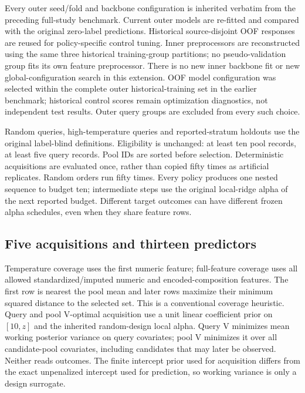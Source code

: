 \documentclass[11pt]{article}
\begin{document}
Every outer seed/fold and backbone configuration is inherited verbatim from the preceding full-study benchmark. Current outer models are re-fitted and compared with the original zero-label predictions. Historical source-disjoint OOF responses are reused for policy-specific control tuning. Inner preprocessors are reconstructed using the same three historical training-group partitions; no pseudo-validation group fits its own feature preprocessor. There is no new inner backbone fit or new global-configuration search in this extension. OOF model configuration was selected within the complete outer historical-training set in the earlier benchmark; historical control scores remain optimization diagnostics, not independent test results. Outer query groups are excluded from every such choice.

Random queries, high-temperature queries and reported-stratum holdouts use the original label-blind definitions. Eligibility is unchanged: at least ten pool records, at least five query records. Pool IDs are sorted before selection. Deterministic acquisitions are evaluated once, rather than copied fifty times as artificial replicates. Random orders run fifty times. Every policy produces one nested sequence to budget ten; intermediate steps use the original local-ridge alpha of the next reported budget. Different target outcomes can have different frozen alpha schedules, even when they share feature rows.

\subsection{Five acquisitions and thirteen predictors}
Temperature coverage uses the first numeric feature; full-feature coverage uses all allowed standardized/imputed numeric and encoded-composition features. The first row is nearest the pool mean and later rows maximize their minimum squared distance to the selected set. This is a conventional coverage heuristic. Query and pool V-optimal acquisition use a unit linear coefficient prior on $[10,z]$ and the inherited random-design local alpha. Query V minimizes mean working posterior variance on query covariates; pool V minimizes it over all candidate-pool covariates, including candidates that may later be observed. Neither reads outcomes. The finite intercept prior used for acquisition differs from the exact unpenalized intercept used for prediction, so working variance is only a design surrogate.
\end{document}
